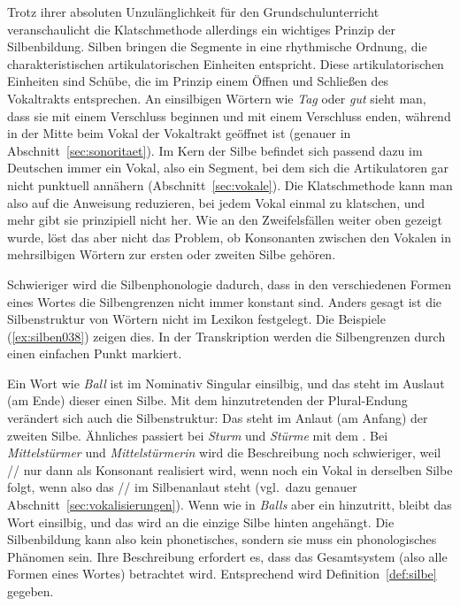 Trotz ihrer absoluten Unzulänglichkeit für den Grundschulunterricht veranschaulicht die Klatschmethode allerdings ein wichtiges Prinzip der Silbenbildung.
Silben bringen die Segmente in eine rhythmische Ordnung, die charakteristischen artikulatorischen Einheiten entspricht.
Diese artikulatorischen Einheiten sind Schübe, die im Prinzip einem Öffnen und Schließen des Vokaltrakts entsprechen.
An einsilbigen Wörtern wie \textit{Tag} \textipa{[ta:k]} oder \textit{gut} \textipa{[gu:t]} sieht man, dass sie mit einem Verschluss beginnen und mit einem Verschluss enden, während in der Mitte beim Vokal der Vokaltrakt geöffnet ist (genauer in Abschnitt~\ref{sec:sonoritaet}).
Im Kern der Silbe befindet sich passend dazu im Deutschen immer ein Vokal, also ein Segment, bei dem sich die Artikulatoren gar nicht punktuell annähern (Abschnitt~\ref{sec:vokale}).
Die Klatschmethode kann man also auf die Anweisung reduzieren, bei jedem Vokal einmal zu klatschen, und mehr gibt sie prinzipiell nicht her.
Wie an den Zweifelsfällen weiter oben gezeigt wurde, löst das aber nicht das Problem, ob Konsonanten zwischen den Vokalen in mehrsilbigen Wörtern zur ersten oder zweiten Silbe gehören.

Schwieriger wird die Silbenphonologie dadurch, dass in den verschiedenen Formen eines Wortes die Silbengrenzen nicht immer konstant sind.
Anders gesagt ist die Silbenstruktur von Wörtern nicht im Lexikon festgelegt.
Die Beispiele (\ref{ex:silben038}) zeigen dies.
In der Transkription werden die Silbengrenzen durch einen einfachen Punkt markiert.

\begin{exe}
  \ex\label{ex:silben038}
  \begin{xlist}
  \end{xlist}
\end{exe}

Ein Wort wie \textit{Ball} ist im Nominativ Singular einsilbig, und das \textipa{[l]} steht im Auslaut (am Ende) dieser einen Silbe.
Mit dem hinzutretenden \textipa{[@]} der Plural-Endung verändert sich auch die Silbenstruktur:
Das \textipa{[l]} steht im Anlaut (am Anfang) der zweiten Silbe.
Ähnliches passiert bei \textit{Sturm} und \textit{Stürme} mit dem \textipa{[m]}.
Bei \textit{Mittelstürmer} \textipa{[mI.t@l.St\t{Y@}.m5]} und \textit{Mittelstürmerin} \textipa{[mI.t@l.St\t{Y@}.m@.KIn]} wird die Beschreibung noch schwieriger, weil // nur dann als Konsonant \textipa{[K]} realisiert wird, wenn noch ein Vokal in derselben Silbe folgt, wenn also das // im Silbenanlaut steht (vgl.\ dazu genauer Abschnitt~\ref{sec:vokalisierungen}).
Wenn wie in \textit{Balls} aber ein \textipa{[s]} hinzutritt, bleibt das Wort einsilbig, und das \textipa{[s]} wird an die einzige Silbe hinten angehängt.
Die Silbenbildung kann also kein phonetisches, sondern sie muss ein phonologisches Phänomen sein.
Ihre Beschreibung erfordert es, dass das Gesamtsystem (also \zB alle Formen eines Wortes) betrachtet wird.
Entsprechend wird Definition~\ref{def:silbe} gegeben.

